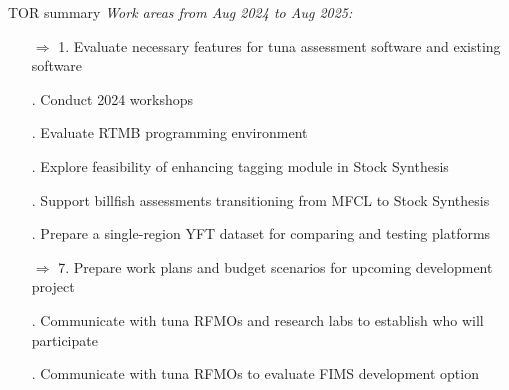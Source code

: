 \documentclass[aspectratio=169,fleqn]{beamer}
\begin{document}
\begin{frame}{\gray TOR summary}\small
  \textit{\gray\fns Work areas from Aug 2024 to Aug 2025:}\\[1ex]
  \begin{enumerate}
    \item[\orange $\Rightarrow$ 1.] Evaluate {\orange necessary features} for
    tuna assessment software and {\orange existing software}\\[1.5ex]
    \item[\gray 2.] \gray Conduct 2024 workshops\\[1.5ex]
    \item[\gray 3.] Evaluate RTMB programming environment\\[1.5ex]
    \item[\gray 4.] \gray Explore feasibility of enhancing tagging module in
    Stock Synthesis\\[1.5ex]
    \item[\gray 5.] \gray Support billfish assessments transitioning from MFCL
    to Stock Synthesis\\[1.5ex]
    \item[\gray 6.] Prepare a single-region YFT dataset for comparing and
    testing platforms\\[1.5ex]
    \item[\orange $\Rightarrow$ 7.] \black Prepare work plans and budget
    scenarios for {\orange upcoming development project}\\[1.5ex]
    \item[\gray 8.] \gray Communicate with tuna RFMOs and research labs to
    establish who will participate\\[1.5ex]
    \item[\gray 9.] Communicate with tuna RFMOs to evaluate FIMS development
    option\\[3ex]
  \end{enumerate}
\end{frame}

\end{document}
